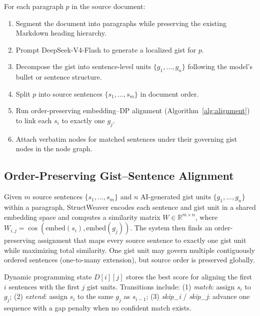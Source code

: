 \documentclass[manuscript,review,anonymous]{acmart}
\begin{document}
For each paragraph $p$ in the source document:
\begin{enumerate}[leftmargin=*, noitemsep]
\item Segment the document into paragraphs while preserving the existing Markdown heading hierarchy.
\item Prompt DeepSeek-V4-Flash to generate a localized gist for $p$.
\item Decompose the gist into sentence-level units $\{g_1, \ldots, g_n\}$ following the model's bullet or sentence structure.
\item Split $p$ into source sentences $\{s_1, \ldots, s_m\}$ in document order.
\item Run order-preserving embedding--DP alignment (Algorithm~\ref{alg:alignment}) to link each $s_i$ to exactly one $g_j$.
\item Attach verbatim nodes for matched sentences under their governing gist nodes in the node graph.
\end{enumerate}

\subsection{Order-Preserving Gist--Sentence Alignment}

Given $m$ source sentences $\{s_1, \ldots, s_m\}$ and $n$ AI-generated gist units $\{g_1, \ldots, g_n\}$ within a paragraph, StructWeaver encodes each sentence and gist unit in a shared embedding space and computes a similarity matrix $W \in \mathbb{R}^{m \times n}$, where $W_{i,j} = \cos(\mathrm{embed}(s_i), \mathrm{embed}(g_j))$. The system then finds an order-preserving assignment that maps every source sentence to exactly one gist unit while maximizing total similarity. One gist unit may govern multiple contiguously ordered sentences (one-to-many extension), but source order is preserved globally.

Dynamic programming state $D[i][j]$ stores the best score for aligning the first $i$ sentences with the first $j$ gist units. Transitions include: (1) \textit{match}: assign $s_i$ to $g_j$; (2) \textit{extend}: assign $s_i$ to the same $g_j$ as $s_{i-1}$; (3) \textit{skip\_i} / \textit{skip\_j}: advance one sequence with a gap penalty when no confident match exists.
\end{document}
